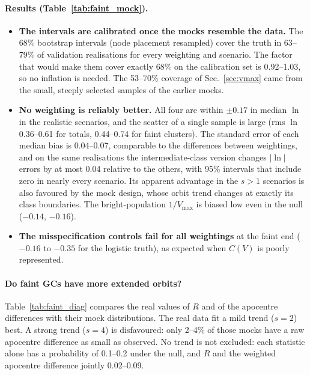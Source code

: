 \documentclass[11pt,a4paper]{article}
\begin{document}
\paragraph{Results (Table~\ref{tab:faint_mock}).}
\begin{itemize}
\item \textbf{The intervals are calibrated once the mocks resemble the data.} The 68\% bootstrap
intervals (node placement resampled) cover the truth in 63--79\% of validation realisations for every
weighting and scenario. The factor that would make them cover exactly 68\% on the calibration set is
0.92--1.03, so no inflation is needed. The 53--70\% coverage of Sec.~\ref{sec:vmax} came from the
small, steeply selected samples of the earlier mocks.
\item \textbf{No weighting is reliably better.} All four are within $\pm0.17$ in median $\ln$ in the
realistic scenarios, and the scatter of a single sample is large (rms $\ln$ 0.36--0.61 for totals,
0.44--0.74 for faint clusters). The standard error of each median bias is 0.04--0.07, comparable to
the differences between weightings, and on the same realisations the intermediate-class version
changes $|\ln|$ errors by at most 0.04 relative to the others, with 95\% intervals that include
zero in nearly every scenario. Its apparent advantage in the $s>1$ scenarios is also favoured by the
mock design, whose orbit trend changes at exactly its class boundaries. The bright-population
$1/V_{\max}$ is biased low even in the null ($-0.14$, $-0.16$).
\item \textbf{The misspecification controls fail for all weightings} at the faint end ($-0.16$ to
$-0.35$ for the logistic truth), as expected when $C(V)$ is poorly represented.
\end{itemize}

\paragraph{Do faint GCs have more extended orbits?} Table~\ref{tab:faint_diag} compares the real values
of $R$ and of the apocentre differences with their mock distributions. The real data fit a mild trend
($s=2$) best. A strong trend ($s=4$) is disfavoured: only 2--4\% of those mocks have a raw apocentre
difference as small as observed. No trend is not excluded: each statistic alone has a probability of
0.1--0.2 under the null, and $R$ and the weighted apocentre difference jointly 0.02--0.09.
\end{document}
